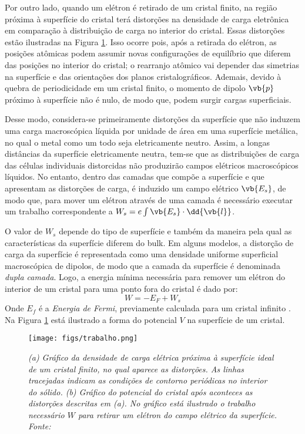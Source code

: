 Por outro lado, quando um elétron é retirado de um cristal finito, na região próxima à superfície do cristal terá distorções na densidade de carga eletrônica em comparação à distribuição de carga no interior do cristal. Essas distorções estão ilustradas na Figura \ref{fig:trabalho}. Isso ocorre pois, após a retirada do elétron, as posições atômicas podem assumir novas configurações de equilíbrio que diferem das posições no interior do cristal; o rearranjo atômico vai depender das simetrias na superfície e das orientações dos planos cristalográficos. Ademais, devido à quebra de periodicidade em um cristal finito, o momento de dipolo $ \vb{p} $ próximo à superfície não é nulo, de modo que, podem surgir cargas superficiais. 

Desse modo, considera-se primeiramente distorções da superfície que não induzem uma carga macroscópica líquida por unidade de área em uma superfície metálica, no qual o metal como um todo seja eletricamente neutro. Assim, a longas distâncias da superfície eletricamente neutra, tem-se que as distribuições de carga das células individuais distorcidas não produzirão campos elétricos macroscópicos líquidos. No entanto, dentro das camadas que compõe a superfície e que apresentam as distorções de carga, é induzido um campo elétrico $ \vb{E_s} $, de modo que, para mover um elétron através de uma camada é necessário executar um trabalho correspondente a $ W_s=e\int\vb{E_s}\cdot \dd{\vb{l}} $.

O valor de $ W_s $ depende do tipo de superfície e também da maneira pela qual as características da superfície diferem do bulk. Em alguns modelos, a distorção de carga da superfície é representada como uma densidade uniforme superficial macroscópica de dipolos, de modo que a camada da superfície é denominada \textit{dupla camada}. Logo, a energia mínima necessária para remover um elétron do interior de um cristal para uma ponto fora do cristal é dado por:
\begin{equation}
	W=-E_F+W_s
\end{equation}
Onde $E_f$ é a \textit{Energia de Fermi}, previamente calculada para um cristal infinito \cite{ashcroft}. Na Figura \ref{fig:trabalho} está ilustrado a forma do potencial $ V $ na superfície de um cristal. 


\begin{figure}[H]
	\centering
	\texttt{[image: figs/trabalho.png]}
	\caption{\textit{(a) Gráfico da densidade de carga elétrica próxima à superfície ideal de um cristal finito, no qual aparece as distorções.  As linhas tracejadas indicam as condições de contorno periódicas no interior do sólido. (b) Gráfico do potencial do cristal após aconteces as distorções descritas em (a). No gráfico está ilustrado o trabalho necessário $ W $ para retirar um elétron do campo elétrico da superfície. Fonte: \citeauthor{ashcroft}}}
	\label{fig:trabalho}
\end{figure}


